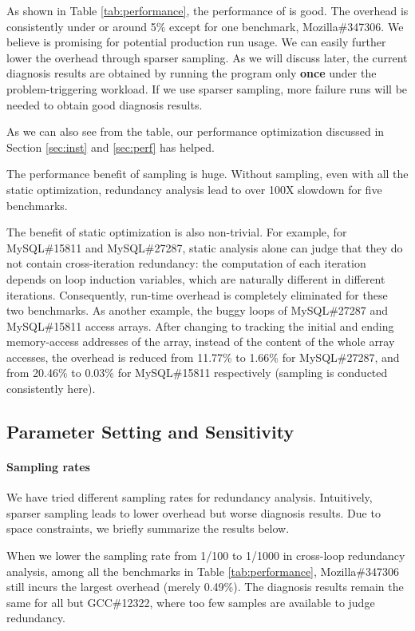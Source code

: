 As shown in Table \ref{tab:performance}, 
the performance of \Tool is good. The overhead is consistently under or around 5\% 
except for one benchmark, Mozilla\#347306. We believe \Tool is promising for potential production
run usage.
We can easily further lower the overhead through sparser sampling.
As we will discuss later, 
the current diagnosis results are obtained by running the
program only \textbf{once} under the problem-triggering workload.
If we use sparser sampling, more failure runs will be needed to obtain good
diagnosis results.

As we can also see from the table, our performance optimization discussed in 
Section \ref{sec:inst} and \ref{sec:perf} has helped.

The performance benefit of sampling is huge.
Without sampling, even with all the static optimization, redundancy
analysis lead to over 100X slowdown for five benchmarks.

The benefit of static optimization is also non-trivial. 
For example, for MySQL\#15811 and MySQL\#27287, static analysis alone can
judge that they do not contain cross-iteration redundancy: the computation of 
each iteration depends on loop induction variables, which are naturally different
in different iterations. Consequently, run-time overhead is completely
eliminated for these two benchmarks.
As another example, the buggy loops of MySQL\#27287 and MySQL\#15811 access 
arrays. 
After changing to tracking the initial and ending memory-access addresses
of the array, instead of the content of the whole array accesses,
the overhead is reduced from 11.77\% to 1.66\% for MySQL\#27287, 
and from 20.46\% to 0.03\% for MySQL\#15811 respectively 
(sampling is conducted consistently here). 

\subsection{Parameter Setting and Sensitivity}
\label{sec:sensi}
\paragraph{Sampling rates}
We have tried different sampling rates for redundancy analysis.
Intuitively, sparser sampling leads to lower overhead but worse diagnosis
results. Due to space constraints, we briefly summarize the results below.

When we lower the sampling rate from 1/100 to 1/1000 
in cross-loop redundancy analysis,
among all the benchmarks in Table \ref{tab:performance},
Mozilla\#347306 still incurs the largest overhead (merely 0.49\%). 
The diagnosis results remain the same for all but
GCC\#12322, where too few samples are available
to judge redundancy.

